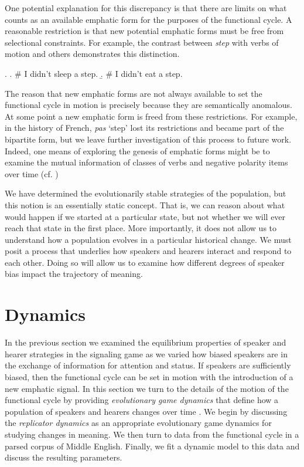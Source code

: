 \documentclass[linguex]{sp}
\theoremstyle{definition} \newtheorem{definition}{Definition}
\begin{document}
One potential explanation for this discrepancy is that there are limits on what counts as an available emphatic form for the purposes of the functional cycle. A reasonable restriction is that  new potential emphatic forms must be free from selectional constraints. For example, the contrast between \emph{step} with verbs of motion and others demonstrates this distinction.

\ex. \a. \# I didn't sleep a step.
       \b. \# I didn't eat a step.

The reason that new emphatic forms are not always available to set the functional cycle in motion is precisely because they are semantically anomalous.   At some point a new emphatic form is freed from these restrictions. For example, in the history of French, \emph{pas} `step' lost its restrictions and became part of the bipartite form, but we leave further investigation of this process to future work. Indeed, one means of exploring the genesis of emphatic forms might be to examine the mutual information of classes of verbs and negative polarity items over time (cf. \citealt{Danescu-Niculescu-Mizil2010})

We have determined the evolutionarily stable strategies of the population, but this notion is an essentially static concept. That is, we can reason about what would happen if we started at a particular state, but not whether we will ever reach that state in the first place. More importantly, it does not allow us to understand how a population evolves in a particular historical change. We must posit a process that underlies how speakers and hearers interact and respond to each other. Doing so will allow us to examine how different degrees of speaker bias impact the trajectory of meaning. 



\section{Dynamics}
\label{Dynamics}

In the previous section we examined the equilibrium properties of speaker and hearer strategies in the signaling game as we varied how biased speakers are in the exchange of information for attention and status. If speakers are sufficiently biased, then the functional cycle can be set in motion with the introduction of a new emphatic signal. In this section we turn to the details of the motion of the functional cycle by providing \emph{evolutionary game dynamics} that define how a population of speakers and hearers changes over time \citep{hofbauer-sigmund1998}. We begin by discussing the \emph{replicator dynamics} \citep{taylor-jonker:1978} as an appropriate evolutionary game dynamics for studying changes in meaning. We then turn to data from the functional cycle in a parsed corpus of Middle English. Finally, we fit a dynamic model to this data and discuss the resulting parameters.
\end{document}

